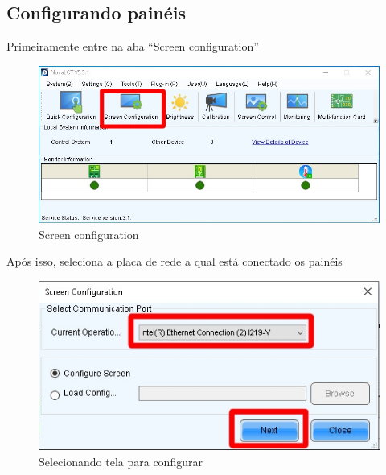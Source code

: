 \documentclass[12pt, a4paper]{article}
\begin{document}
\newpage
\subsection{Configurando painéis}\label{Configurando painéis}
Primeiramente entre na aba ``Screen configuration''
\begin{figure}[!htb]
	\centering
	\includegraphics[width=\textwidth]{menuAdm.jpeg}
	\caption{\label{fig:menuAdm.jpeg}Screen configuration}
\end{figure}

\vfill

Após isso, seleciona a placa de rede a qual está conectado os painéis
\begin{figure}[!htb]
	\centering
	\includegraphics[width=\textwidth]{SC0.jpeg}
	\caption{\label{fig:SC0.jpeg}Selecionando tela para configurar}
\end{figure}
\end{document}
